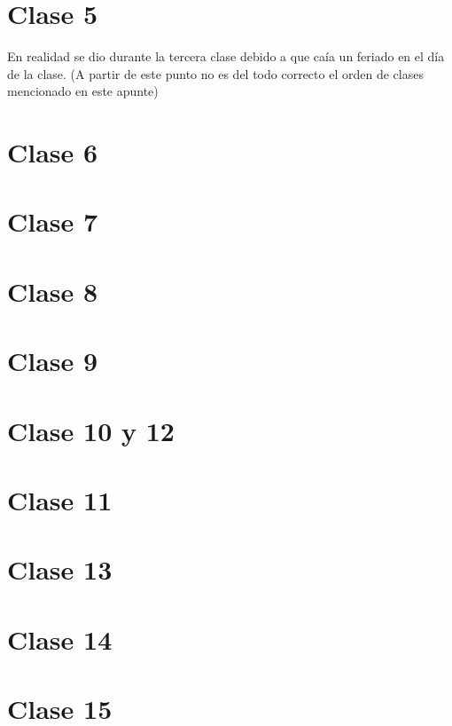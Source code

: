 \documentclass[titlepage,a4paper]{article}
\begin{document}
\section*{Clase 5}
En realidad se dio durante la tercera clase debido a que caía un feriado en el día de la clase. (A partir de este punto no es del todo correcto el orden de clases mencionado en este apunte)


\section*{Clase 6}


\section*{Clase 7}


\section*{Clase 8}


\section*{Clase 9}


\section*{Clase 10 y 12}



\section*{Clase 11}


\section*{Clase 13}


\section*{Clase 14}


\section*{Clase 15}

\end{document}
